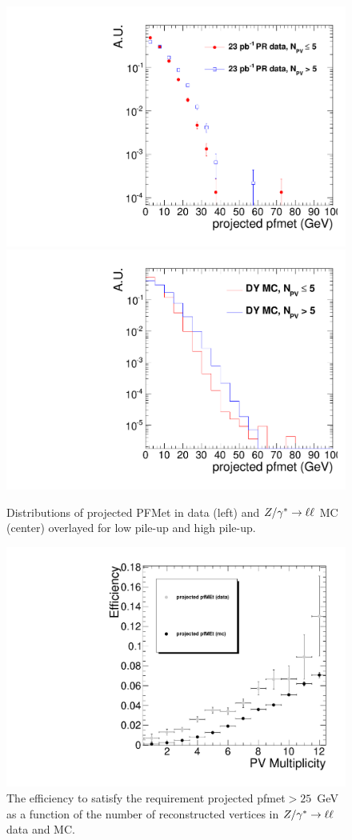 \begin{figure}[hbt]
\begin{center}
\includegraphics[width=0.4\linewidth]{figures/pfmet_data.pdf} 
\includegraphics[width=0.4\linewidth]{figures/pfmet_dymc.pdf}
\caption{\label{fig:met_pu}\protect Distributions of projected PFMet in data (left) and $Z/\gamma^*\to\ell\ell$ MC (center) 
overlayed for low pile-up and high pile-up.}
\end{center}
\begin{center}
\includegraphics[width=0.5\linewidth]{figures/proj_pfmet_Eff25.pdf} 
\caption{\label{fig:meteff_pu}\protect The efficiency to satisfy the requirement projected pfmet$>25$~GeV as a function
of the number of reconstructed vertices in $Z/\gamma^*\to\ell\ell$ data and MC.}
\end{center}
\end{figure}

